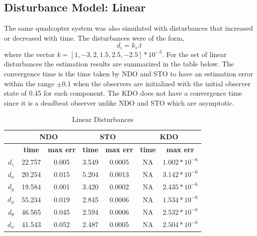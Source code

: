 \documentclass[letterpaper%
, twoside%
, 12pt%
,memoire%
, english%
,creativecommons,hyperref%
]{thETS}
\begin{document}
\subsection{Disturbance Model: Linear}
The same quadcopter system was also simulated with disturbances that increased or decreased with time. The disturbances were of the form, 
\begin{equation}
d_i = k_i.t
\label{eq:dist_3}
\end{equation}
where the vector $k=[1,-3,2,1.5,2.5,-2.5]*10^{-3}$. 
For the set of linear disturbances the estimation results are summarized in the table below. The convergence time is the time taken by NDO and STO to have an estimation error within the range $\pm0.1$ when the observers are initialized with the initial observer state of 0.45 for each component. The KDO does not have a convergence time since it is a deadbeat observer unlike NDO and STO which are asymptotic.
\begin{table}[!htbp]
\centering
\caption{Linear Disturbances}
\begin{tabular}{|c|c|c|c|c|c|c|}
\hline
{}  &  \multicolumn{2}{c|}{\textbf{NDO}} & \multicolumn{2}{c|}{\textbf{STO}} & \multicolumn{2}{c|}{\textbf{KDO}}\\
\hline
{}        &  \textbf{time}  & \textbf{max err}  & \textbf{time}  & \textbf{max err}& \textbf{time}  & \textbf{max err}\\
$d_z$     &  22.757 & 0.005   & 3.549  & 0.0005 & NA     & $1.002*10^{-6}$\\
$d_x$     &  20.254 & 0.015   & 5.204  & 0.0013 & NA     & $3.142*10^{-6}$\\
$d_y$     &  19.584 & 0.001   & 3.420  & 0.0002 & NA     & $2.435*10^{-6}$\\
$d_\phi$  &  55.234 & 0.019   & 2.845  & 0.0006 & NA     & $1.534*10^{-6}$\\
$d_\theta$&  46.565 & 0.045   & 2.594  & 0.0006 & NA     & $2.532*10^{-6}$\\
$d_\psi$  &  41.543 & 0.052   & 2.487  & 0.0005 & NA     & $2.504*10^{-6}$\\
\hline
\end{tabular}
\end{table}
\end{document}
